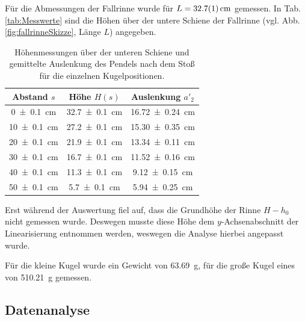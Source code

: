 	Für die Abmessungen der Fallrinne wurde für $L = \SI{32,7 +- 0,1}{\centi\meter}$ gemessen.
	In Tab. \ref{tab:Messwerte} sind die Höhen über der untere Schiene der Fallrinne (vgl. Abb. \ref{fig:fallrinneSkizze}, Länge $L$) angegeben.
	\begin{table}[ht]
		\centering
		\caption{Höhenmessungen über der unteren Schiene und gemittelte Auslenkung des Pendels nach dem Stoß für die einzelnen Kugelpositionen.}
		\begin{tabular}{S|S|S}
			\hline
			{Abstand $s$} & {Höhe $H(s)$}  & {Auslenkung $a'_2$}\\
			\hline
			\SI{0 +- 0,1}{\centi\meter} & \SI{32,7 +- 0,1}{\centi\meter} & \SI{16,72 +- 0,24}{\centi\meter}\\
			\SI{10 +- 0,1}{\centi\meter} & \SI{27,2 +- 0,1}{\centi\meter} & \SI{15,30 +- 0,35}{\centi\meter}\\
			\SI{20 +- 0,1}{\centi\meter} & \SI{21,9 +- 0,1}{\centi\meter} & \SI{13,34 +- 0,11}{\centi\meter}\\
			\SI{30 +- 0,1}{\centi\meter} & \SI{16,7 +- 0,1}{\centi\meter} & \SI{11,52 +- 0,16}{\centi\meter}\\
			\SI{40 +- 0,1}{\centi\meter} & \SI{11,3 +- 0,1}{\centi\meter} & \SI{9,12 +- 0,15}{\centi\meter}\\
			\SI{50 +- 0,1}{\centi\meter} & \SI{5,7 +- 0,1}{\centi\meter} & \SI{5,94 +- 0,25}{\centi\meter}\\
			\hline
		\end{tabular}
	\end{table}
	Erst während der Auswertung fiel auf, dass die Grundhöhe der Rinne $H - h_0$ nicht gemessen wurde.
	Deswegen musste diese Höhe dem $y$-Achsenabschnitt der Linearisierung entnommen werden, weswegen die Analyse hierbei angepasst wurde.
	
	Für die kleine Kugel wurde ein Gewicht von \SI{63,69}{g}, für die große Kugel eines von \SI{510,21}{g} gemessen.
	
	\subsection{Datenanalyse}
	
